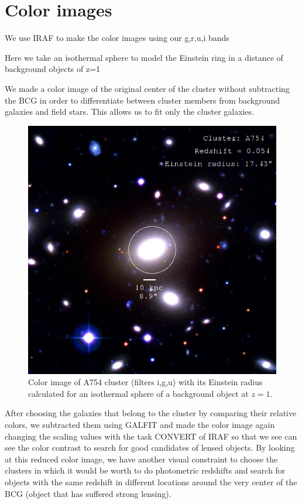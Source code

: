 \section{Color images} 

We use IRAF to make the color images using our g,r,u,i bands 

Here we take an isothermal sphere to model the Einstein ring in a distance of background objects of z=1

We made a color image of the original center of the cluster without subtracting the BCG in order to differentiate between cluster members from background galaxies and field stars. This allows us to fit only the cluster galaxies. 

\begin{figure}[H]
\centering
\includegraphics[width=12cm]{images/cA754.jpg}
\caption[Color image of A754]{Color image of A754 cluster (filters i,g,u) with its Einstein radius calculated for an isothermal sphere of a background object at $z=1$.}
\end{figure}

After choosing the galaxies that belong to the cluster by comparing their relative colors, we subtracted them using GALFIT and made the color image again changing the scaling values with the task CONVERT of IRAF so that we see can see the color contrast to search for good candidates of lensed objects. By looking at this reduced color image, we have another visual constraint to choose the clusters in which it would be worth to do photometric redshifts and search for objects with the same redshift in different locations around the very center of the BCG (object that has suffered strong lensing). 

